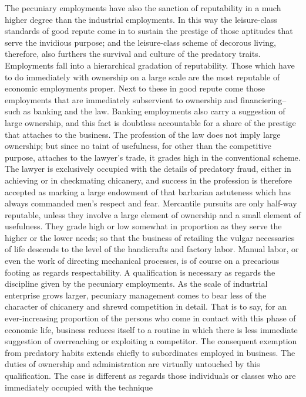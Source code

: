\documentclass[12pt]{report}
\begin{document}
The pecuniary employments have also the sanction of reputability in
a much higher degree than the industrial employments. In this way the
leisure-class standards of good repute come in to sustain the
prestige of those aptitudes that serve the invidious purpose; and the
leisure-class scheme of decorous living, therefore, also furthers the
survival and culture of the predatory traits. Employments fall into
a hierarchical gradation of reputability. Those which have to do
immediately with ownership on a large scale are the most reputable of
economic employments proper. Next to these in good repute come
those employments that are immediately subservient to ownership and
financiering--such as banking and the law. Banking employments also
carry a suggestion of large ownership, and this fact is doubtless
accountable for a share of the prestige that attaches to the business.
The profession of the law does not imply large ownership; but since no
taint of usefulness, for other than the competitive purpose, attaches
to the lawyer's trade, it grades high in the conventional scheme. The
lawyer is exclusively occupied with the details of predatory fraud,
either in achieving or in checkmating chicanery, and success in the
profession is therefore accepted as marking a large endowment of that
barbarian astuteness which has always commanded men's respect and fear.
Mercantile pursuits are only half-way reputable, unless they involve a
large element of ownership and a small element of usefulness. They grade
high or low somewhat in proportion as they serve the higher or the lower
needs; so that the business of retailing the vulgar necessaries of
life descends to the level of the handicrafts and factory labor. Manual
labor, or even the work of directing mechanical processes, is of course
on a precarious footing as regards respectability. A qualification is
necessary as regards the discipline given by the pecuniary employments.
As the scale of industrial enterprise grows larger, pecuniary management
comes to bear less of the character of chicanery and shrewd competition
in detail. That is to say, for an ever-increasing proportion of the
persons who come in contact with this phase of economic life, business
reduces itself to a routine in which there is less immediate suggestion
of overreaching or exploiting a competitor. The consequent exemption
from predatory habits extends chiefly to subordinates employed in
business. The duties of ownership and administration are virtually
untouched by this qualification. The case is different as regards those
individuals or classes who are immediately occupied with the technique
\end{document}
